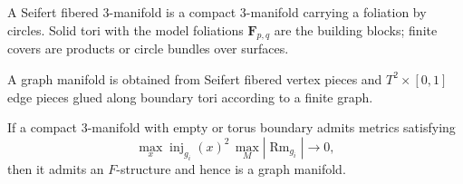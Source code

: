 \begin{definition}
\label{def:chow-iv-seifert-fibered}
A Seifert fibered 3-manifold is a compact 3-manifold carrying a foliation by
circles.  Solid tori with the model foliations \(\mathbf F_{p,q}\) are the
building blocks; finite covers are products or circle bundles over surfaces.
\end{definition}

\begin{definition}
\label{def:chow-iv-graph-manifold}
A graph manifold is obtained from Seifert fibered vertex pieces and
\(T^2\times[0,1]\) edge pieces glued along boundary tori according to a finite
graph.
\end{definition}

\begin{theorem}
\label{thm:chow-iv-cheeger-gromov-graph-manifold}
If a compact 3-manifold with empty or torus boundary admits metrics satisfying
\[
\max_x\operatorname{inj}_{g_i}(x)^2\,\max_M|\operatorname{Rm}_{g_i}|\longrightarrow0,
\]
then it admits an \(F\)-structure and hence is a graph manifold.
\end{theorem}
